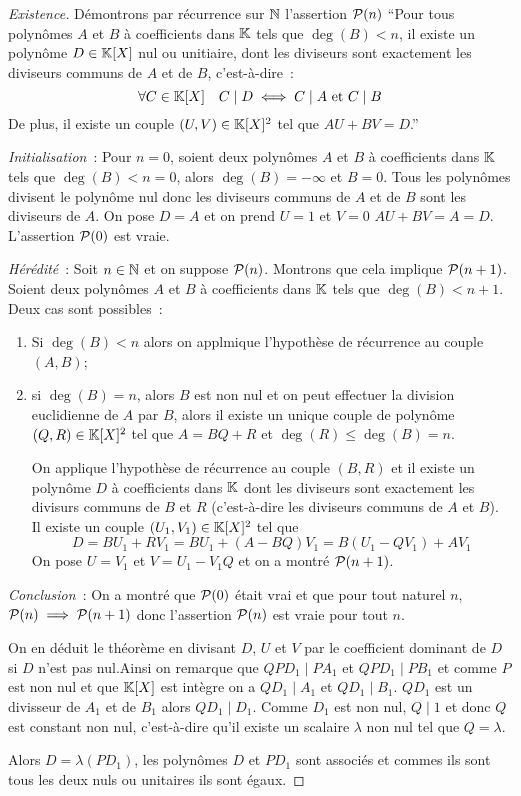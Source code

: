 \begin{proof}[Existence]
  Démontrons par récurrence sur $\N$ l'assertion $\P(n)$ ``Pour tous polynômes $A$ et $B$ à coefficients dans $\K$ tels que $\deg(B)<n$, il existe un polynôme $D \in \K[X]$  nul ou unitiaire, dont les diviseurs sont exactement les diviseurs communs de $A$ et de $B$, c'est-à-dire~:
  \begin{equation}
    \forall C \in \K[X] \quad C\mid{}D \iff C\mid{}A \text{~et~} C\mid{}B
  \end{equation}
  De plus, il existe un couple $(U,V) \in \K[X]^2$ tel que $AU+BV=D$.''

  \emph{Initialisation}~: Pour $n=0$, soient deux polynômes $A$ et $B$ à coefficients dans $\K$ tels que $\deg(B)<n=0$, alors $\deg(B)=-\infty$ et $B=0$. Tous les polynômes divisent le polynôme nul donc les diviseurs communs de $A$ et de $B$ sont les diviseurs de $A$. On pose $D=A$ et on prend $U=1$ et $V=0$ $AU+BV=A=D$. L'assertion $\P(0)$ est vraie.

  \emph{Hérédité}~: Soit $n \in \N$ et on suppose $\P(n)$. Montrons que cela implique $\P(n+1)$. Soient deux polynômes $A$ et $B$ à coefficients dans $\K$ tels que $\deg(B)<n+1$. Deux cas sont possibles~:
  \begin{enumerate}
  \item Si $\deg(B)<n$ alors on applmique l'hypothèse de récurrence au couple $(A,B)$;
  \item si $\deg(B)=n$, alors $B$ est non nul et on peut effectuer la division euclidienne de $A$ par $B$, alors il existe un unique couple de polynôme $(Q,R) \in \K[X]^2$ tel que $A=BQ+R$ et $\deg(R)\leq\deg(B)=n$.

    On applique l'hypothèse de récurrence au couple $(B,R)$ et il existe un polynôme $D$ à coefficients dans $\K$ dont les diviseurs sont exactement les divisurs communs de $B$ et $R$ (c'est-à-dire les diviseurs communs de $A$ et $B$). Il existe un couple $(U_1,V_1) \in \K[X]^2$ tel que
    \begin{equation}
      D=BU_1+RV_1=BU_1+(A-BQ)V_1=B(U_1-QV_1)+AV_1
    \end{equation}
    On pose $U=V_1$ et $V=U_1-V_1Q$ et on a montré $\P(n+1)$.
  \end{enumerate}
  
  \emph{Conclusion}~: On a montré que $\P(0)$ était vrai et que pour tout naturel $n$, $\P(n)\implies\P(n+1)$ donc l'assertion $\P(n)$ est vraie pour tout $n$.
  
  On en déduit le théorème en divisant $D$, $U$ et $V$ par le coefficient dominant de $D$ si $D$ n'est pas nul.Ainsi on remarque que  $QPD_1 \mid{}PA_1$ et $QPD_1\mid{}PB_1$ et comme $P$ est non nul et que $\K[X]$ est intègre on a $QD_1 \mid{}A_1$ et $QD_1\mid{}B_1$. $QD_1$ est un divisseur de $A_1$ et de $B_1$ alors $QD_1\mid{}D_1$. Comme $D_1$ est non nul, $Q\mid{}1$ et donc $Q$ est constant non nul, c'est-à-dire qu'il existe un scalaire $\lambda$ non nul tel que $Q=\lambda$. 

  Alors $D=\lambda(PD_1)$, les polynômes $D$ et $PD_1$ sont associés et commes ils sont tous les deux nuls ou unitaires ils sont égaux.
\end{proof}

